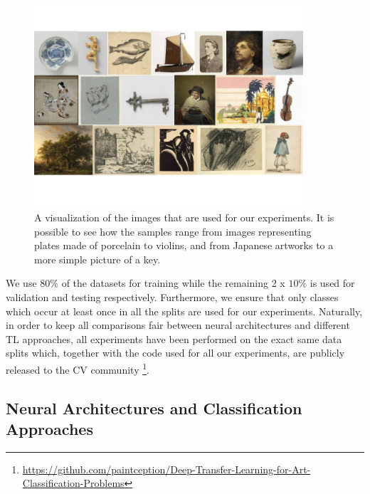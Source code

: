 


\begin{figure}
\centering
  \includegraphics[width=10cm]{./Images/Chapter03/datasets.jpg}\vspace{-1cm}
  \caption{A visualization of the images that are used for our experiments. It is possible to see how the samples range from images representing plates made of porcelain to violins, and from Japanese artworks to a more simple picture of a key.}
  \label{fig:datasets}
\end{figure}

We use $80\%$ of the datasets for training while the remaining 2 x $10\%$ is used for validation and testing respectively. Furthermore, we ensure that only classes which occur at least once in all the splits are used for our experiments. Naturally, in order to keep all comparisons fair between neural architectures and different TL approaches, all experiments have been performed on the exact same data splits which, together with the code used for all our experiments, are publicly released to the CV community \footnote{\url{https://github.com/paintception/Deep-Transfer-Learning-for-Art-Classification-Problems}}. 

\subsection{Neural Architectures and Classification Approaches}
\label{subsec: neural_nets}

